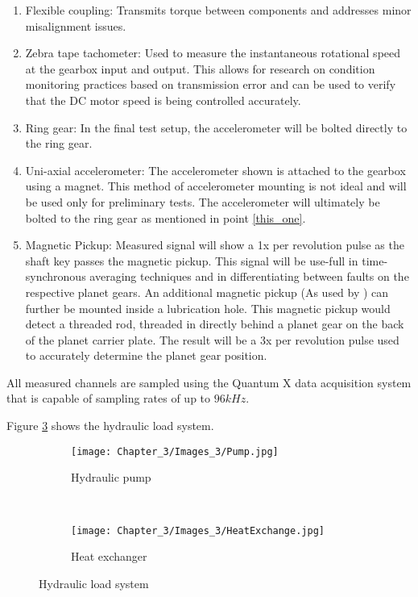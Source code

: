 \begin{enumerate}
	\item Flexible coupling: Transmits torque between components and addresses minor misalignment issues.
	\item Zebra tape tachometer: Used to measure the instantaneous rotational speed at the gearbox input and output. This allows for research on condition monitoring practices based on transmission error and can be used to verify that the DC motor speed is being controlled accurately. 
	\item \label{this_one} Ring gear: In the final test setup, the accelerometer will be bolted directly to the ring gear. 
	\item Uni-axial accelerometer: The accelerometer shown is attached to the gearbox using a magnet. This method of accelerometer mounting is not ideal and will be used only for preliminary tests. The accelerometer will ultimately be bolted to the ring gear as mentioned in point \ref{this_one}.
	\item Magnetic Pickup: Measured signal will show a 1x per revolution pulse as the shaft key passes the magnetic pickup. This signal will be use-full in time-synchronous averaging techniques and in differentiating between faults on the respective planet gears. An additional magnetic pickup (As used by \cite{Smidt2009}) can further be mounted inside a lubrication hole. This magnetic pickup would detect a threaded rod, threaded in directly behind a planet gear on the back of the planet carrier plate. The result will be a 3x per revolution pulse used to accurately determine the planet gear position. 
\end{enumerate}

All measured channels are sampled using the Quantum X data acquisition system that is capable of sampling rates of up to $96 kHz$. 


Figure \ref{F:Hydraulic} shows the hydraulic load system.

\begin{figure}[H]
	\centering
	\begin{subfigure}{0.35\textwidth}
		\texttt{[image: Chapter\_3/Images\_3/Pump.jpg]}
		\caption{Hydraulic pump}
		\label{F:Hydraulic_pump}
	\end{subfigure}
	~
	\begin{subfigure}{0.55\textwidth}
		\texttt{[image: Chapter\_3/Images\_3/HeatExchange.jpg]}
		\caption{Heat exchanger}
		\label{F:Heat_Exchange}
	\end{subfigure}
	
	\caption{Hydraulic load system}
	\label{F:Hydraulic}
\end{figure}

